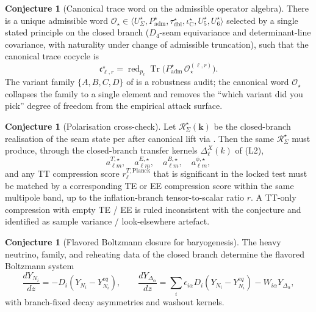 \documentclass[11pt,a4paper]{article}
\theoremstyle{definition}
\newtheorem{conjecture}[theorem]{Conjecture}
\theoremstyle{remark}
\newcommand{\taudbl}{\tau_{\mathrm{dbl}}}
\newcommand{\iC}{\iota_{\mathrm C}}
\newcommand{\Padm}{P_{\mathrm{adm}}}
\begin{document}
\begin{conjecture}[Canonical trace word on the admissible operator algebra]
\label{conj:canonical-trace-word}
There is a unique admissible word
$\mathcal O_\star\in\langle U_\Sigma^\star,\Padm^\star,\taudbl^\star,\iC^\star,U_5^\star,U_6^\star\rangle$
selected by a single stated principle on the closed branch ($D_4$-seam equivariance and
determinant-line covariance, with naturality under change of admissible truncation), such that the
canonical trace cocycle is
\[
\mathfrak c_{\ell,r}^\star
=
\operatorname{red}_{p_\ell}\operatorname{Tr}\bigl(\Padm^\star\,\mathcal O_\star^{(\ell,r)}\bigr).
\]
The variant family $\{A,B,C,D\}$ of  is a robustness audit; the
canonical word $\mathcal O_\star$ collapses the family to a single element and removes the
``which variant did you pick'' degree of freedom from the empirical attack surface.
\end{conjecture}

\begin{conjecture}[Polarisation cross-check]
\label{conj:polarisation-cross-check}
Let $\mathcal R_\Sigma^\star(\mathbf k)$ be the closed-branch realisation of the seam state per
 after canonical lift via
. Then the same $\mathcal R_\Sigma^\star$
must produce, through the closed-branch transfer kernels $\Delta_\ell^X(k)$ of (L2),
\[
a_{\ell m}^{T,\star},\quad
a_{\ell m}^{E,\star},\quad
a_{\ell m}^{B,\star},\quad
a_{\ell m}^{\phi,\star},
\]
and any TT compression score $r_\ell^{T,\mathrm{Planck}}$ that is significant in the locked test
must be matched by a corresponding TE or EE compression score within the same multipole band, up
to the inflation-branch tensor-to-scalar ratio $r$. A TT-only compression with empty TE / EE is
ruled inconsistent with the conjecture and identified as sample variance / look-elsewhere
artefact.
\end{conjecture}

\begin{conjecture}[Flavored Boltzmann closure for baryogenesis]
\label{thm:flavored_boltzmann_closure_baryogenesis}
The heavy neutrino, family, and reheating data of the closed branch determine the flavored
Boltzmann system
\[
\frac{dY_{N_i}}{dz}=-D_i(Y_{N_i}-Y_{N_i}^{eq}),
\qquad
\frac{dY_{\Delta_\alpha}}{dz}
=
\sum_i \epsilon_{i\alpha}D_i(Y_{N_i}-Y_{N_i}^{eq})-W_{i\alpha}Y_{\Delta_\alpha},
\]
with branch-fixed decay asymmetries and washout kernels.
\end{conjecture}
\end{document}
